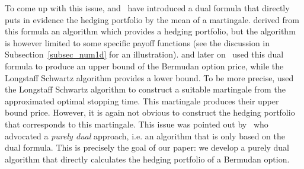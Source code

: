 To come up with this issue, \cite{rogers-02} and~\cite{HK} have introduced a dual formula that directly puts in evidence the hedging portfolio by the mean of a martingale. \cite{rogers-02} derived from this formula an algorithm which provides a hedging portfolio, but the algorithm is however limited to some specific payoff functions (see the discussion in Subsection~\ref{subsec_num1d} for an illustration). \cite{HK} and later on~\cite{AB} used this dual formula to produce an upper bound of the Bermudan option price, while the Longstaff Schwartz algorithm provides a lower bound.  To be more precise, \cite{AB} used the Longstaff Schwartz algorithm to construct a suitable martingale from the approximated optimal stopping time. This martingale produces their upper bound price.  However, it is again not obvious to construct the hedging portfolio that corresponds to this martingale. This issue was pointed out by~\cite{rogers-10} who advocated a {\em purely dual} approach, i.e. an algorithm that is only based on the dual formula. This is precisely the goal of our paper: we develop a purely dual algorithm that directly calculates the hedging portfolio of a Bermudan option. 

